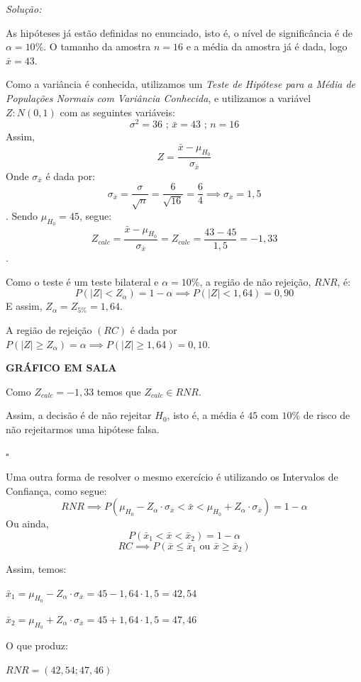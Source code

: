 \documentclass[oneside,a4paper,12pt]{article}
\begin{document}
\textit{Solução:}

As hipóteses já estão definidas no enunciado, isto é, o nível de significância é de $\alpha = 10\%$. O tamanho da amostra $n = 16$ e a média da amostra já é dada, logo $\bar{x} = 43$.

Como a variância é conhecida, utilizamos um \emph{Teste de Hipótese para a Média de Populações Normais com Variância Conhecida}, e utilizamos a variável $Z:N(0,1)$ com as seguintes variáveis:
$$\sigma^2 = 36 \text{  ;   } \bar{x} = 43 \text{  ;   } n = 16$$
Assim,
$$Z = \frac{\bar{x} - \mu_{H_0}}{\sigma_{\bar{x}}}$$
Onde $\sigma_{\bar{x}}$ é dada por:
$$\sigma_{\bar{x}} = \frac{\sigma}{\sqrt{n}} = \frac{6}{\sqrt{16}} = \frac{6}{4} \implies \sigma_{\bar{x}} = 1,5$$.
Sendo $\mu_{H_0} = 45$, segue:
$$Z_{calc} = \frac{\bar{x} - \mu_{H_0}}{\sigma_{\bar{x}}} = Z_{calc} = \frac{43 - 45}{1,5} = -1,33 $$.

Como o teste é um teste bilateral e $\alpha = 10\%$, a região de não rejeição, $RNR$, é:
$$P(|Z| < Z_{\alpha}) = 1 - \alpha \implies P(|Z| < 1,64) = 0,90$$ 
E assim, $Z_{\alpha} = Z_{5\%} = 1,64$.

A região de rejeição $(RC)$ é dada por $P(|Z| \geq Z_{\alpha}) = \alpha \implies P(|Z| \geq 1,64) = 0,10$.

\textbf{GRÁFICO EM SALA}

Como $Z_{calc} = -1,33$ temos que $Z_{calc} \in RNR$.

Assim, a decisão é de não rejeitar $H_0$, isto é, a média é $45$ com $10\%$ de risco de não rejeitarmos uma hipótese falsa.

\begin{flushright}
	$\square$
\end{flushright}

Uma outra forma de resolver o mesmo exercício é utilizando os Intervalos de Confiança, como segue:
$$RNR \implies P(\mu_{H_0} - Z_{\alpha} \cdot \sigma_{\bar{x}} < \bar{x} < \mu_{H_0} + Z_{\alpha} \cdot \sigma_{\bar{x}}) = 1 - \alpha$$
Ou ainda,
$$P(\bar{x}_1 < \bar{x} < \bar{x}_2) = 1 - \alpha$$
$$RC \implies P(\bar{x} \leq \bar{x}_1 \text{ ou } \bar{x} \geq \bar{x}_2)$$

Assim, temos:

$\bar{x}_1 = \mu_{H_0} - Z_{\alpha} \cdot \sigma_{\bar{x}} = 45 - 1,64 \cdot 1,5 = 42,54$

$\bar{x}_2 = \mu_{H_0} + Z_{\alpha} \cdot \sigma_{\bar{x}} = 45 + 1,64 \cdot 1,5 = 47,46$

O que produz:

$RNR = (42,54; 47,46)$
\end{document}
